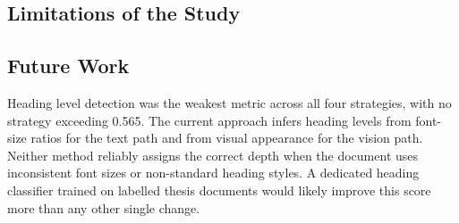 \documentclass[12pt]{article}
\begin{document}
\subsection{Limitations of the Study}

\subsection{Future Work}

Heading level detection was the weakest metric across all four strategies,
with no strategy exceeding 0.565.
The current approach infers heading levels from font-size ratios for the
text path and from visual appearance for the vision path.
Neither method reliably assigns the correct depth when the document uses
inconsistent font sizes or non-standard heading styles.
A dedicated heading classifier trained on labelled thesis documents would
likely improve this score more than any other single change.
\end{document}
